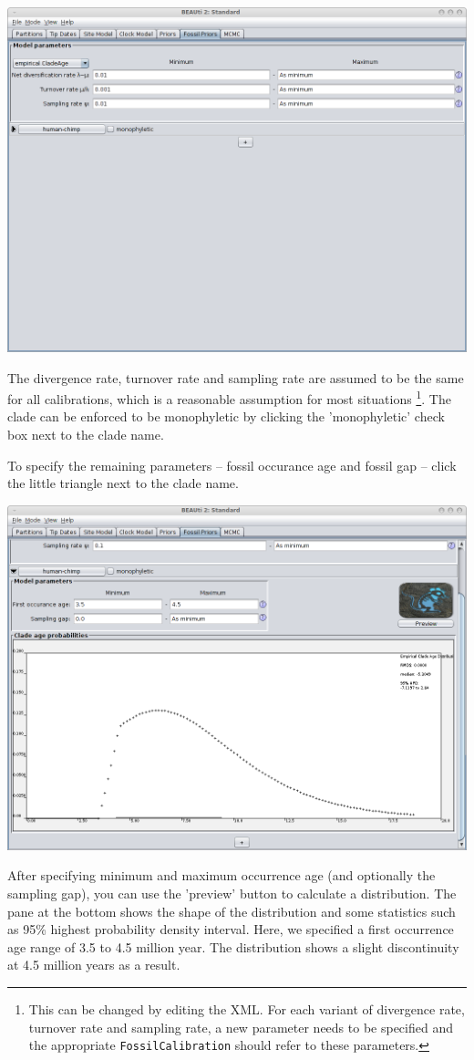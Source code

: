\documentclass{article}
\begin{document}
\begin{center}\includegraphics[width=\textwidth,clip=true,trim=0 300 0 0]{fossilPriorsTab2.png}\end{center}
The divergence rate, turnover rate and sampling rate are assumed to be the same
for all calibrations, which is a reasonable assumption for most situations
\footnote{This can be changed by editing the XML. For each variant of divergence
	rate, turnover rate and sampling rate, a new parameter needs to be specified
	and the appropriate {\tt FossilCalibration} should refer to these parameters.}.
The clade can be enforced to be monophyletic by clicking the 'monophyletic' check box
next to the clade name.

To specify the remaining parameters -- fossil occurance age and fossil gap -- click the 
little triangle next to the clade name.
\begin{center}\includegraphics[width=\textwidth,clip=true]{preview.png}\end{center}
After specifying minimum and maximum occurrence age (and optionally the sampling gap),
you can use the 'preview' button to calculate a distribution. The pane at the bottom
shows the shape of the distribution and some statistics such as 95\% highest probability
density interval. Here, we specified a first occurrence age range of 3.5 to 4.5 million
year. The distribution shows a slight discontinuity at 4.5 million years as a result.
\end{document}
